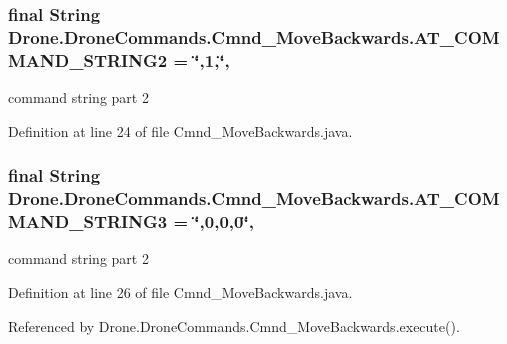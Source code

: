 \subsubsection[{A\+T\+\_\+\+C\+O\+M\+M\+A\+N\+D\+\_\+\+S\+T\+R\+I\+N\+G2}]{\setlength{\rightskip}{0pt plus 5cm}final String Drone.\+Drone\+Commands.\+Cmnd\+\_\+\+Move\+Backwards.\+A\+T\+\_\+\+C\+O\+M\+M\+A\+N\+D\+\_\+\+S\+T\+R\+I\+N\+G2 = \char`\"{},1,\char`\"{}\hspace{0.3cm}{\ttfamily [static]}, {\ttfamily [private]}}\label{class_drone_1_1_drone_commands_1_1_cmnd___move_backwards_a253062f14f3f50f1eae102a97a743876}
command string part 2 

Definition at line 24 of file Cmnd\+\_\+\+Move\+Backwards.\+java.

\hypertarget{class_drone_1_1_drone_commands_1_1_cmnd___move_backwards_aadb85a8030191ae34469dd541ab59c4e}{}
\subsubsection[{A\+T\+\_\+\+C\+O\+M\+M\+A\+N\+D\+\_\+\+S\+T\+R\+I\+N\+G3}]{\setlength{\rightskip}{0pt plus 5cm}final String Drone.\+Drone\+Commands.\+Cmnd\+\_\+\+Move\+Backwards.\+A\+T\+\_\+\+C\+O\+M\+M\+A\+N\+D\+\_\+\+S\+T\+R\+I\+N\+G3 = \char`\"{},0,0,0\char`\"{}\hspace{0.3cm}{\ttfamily [static]}, {\ttfamily [private]}}\label{class_drone_1_1_drone_commands_1_1_cmnd___move_backwards_aadb85a8030191ae34469dd541ab59c4e}
command string part 2 

Definition at line 26 of file Cmnd\+\_\+\+Move\+Backwards.\+java.



Referenced by Drone.\+Drone\+Commands.\+Cmnd\+\_\+\+Move\+Backwards.\+execute().

\hypertarget{class_drone_1_1_drone_commands_1_1_cmnd___move_backwards_ab2fe68c416f15558165a29a12981fc43}{}
